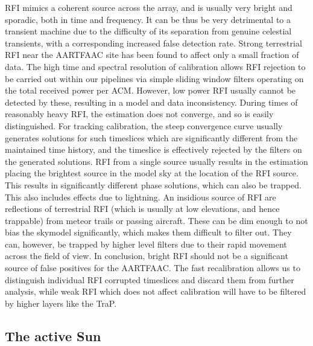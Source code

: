 \documentclass{aa}
\begin{document}
RFI mimics  a coherent source across the  array, and is usually  very bright and
sporadic, both in  time and frequency. It  can be thus be very  detrimental to a
transient machine due to the difficulty of its separation from genuine celestial
transients,  with  a  corresponding  increased  false  detection  rate.   Strong
terrestrial RFI  near the AARTFAAC  site has been  found to affect only  a small
fraction of  data. The high time  and spectral resolution  of calibration allows
RFI rejection to  be carried out within our pipelines  via simple sliding window
filters operating on  the total received power per ACM.   However, low power RFI
usually  cannot   be  detected  by  these,   resulting  in  a   model  and  data
inconsistency.  During  times of reasonably  heavy RFI, the estimation  does not
converge, and so  is easily distinguished.  For tracking  calibration, the steep
convergence  curve usually  generates solutions  for such  timeslices  which are
significantly different from  the maintained time history, and  the timeslice is
effectively  rejected by  the filters  on the  generated solutions.  RFI  from a
single source usually results in  the estimation placing the brightest source in
the model sky at the location  of the RFI source.  This results in significantly
different phase solutions, which can also be trapped. This also includes effects
due to lightning.  An insidious source of RFI are reflections of terrestrial RFI
(which is usually at low elevations,  and hence trappable) from meteor trails or
passing  aircraft.   These  can  be  dim   enough  to  not   bias  the  skymodel
significantly, which makes them difficult  to filter out.  They can, however, be
trapped by higher level filters due  to their rapid movement across the field of
view.  In  conclusion, bright RFI  should not be  a significant source  of false
positives for  the AARTFAAC.   The fast recalibration  allows us  to distinguish
individual  RFI corrupted  timeslices and  discard them  from  further analysis,
while weak  RFI which does  not affect calibration  will have to be  filtered by
higher layers like the TraP.

\subsection{The active Sun}
\end{document}
